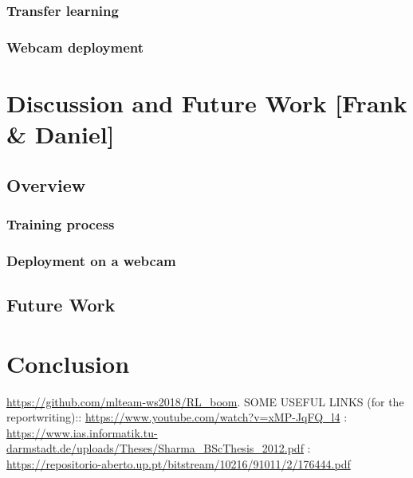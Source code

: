 \documentclass[a4paper]{article}
\begin{document}
\subsubsection*{Transfer learning}

\subsubsection*{Webcam deployment}

\section{Discussion and Future Work  [Frank \& Daniel]}

\subsection*{Overview}

\subsubsection*{Training process}

\subsubsection*{Deployment on a webcam}


\subsection*{Future Work}



\section{Conclusion}
\url{https://github.com/mlteam-ws2018/RL_boom}.
SOME USEFUL LINKS (for the reportwriting)::  \url{https://www.youtube.com/watch?v=xMP-JqFQ_l4} :  \url{https://www.ias.informatik.tu-darmstadt.de/uploads/Theses/Sharma_BScThesis_2012.pdf} :  \url{https://repositorio-aberto.up.pt/bitstream/10216/91011/2/176444.pdf} \newline
\newpage
 


\end{document}
